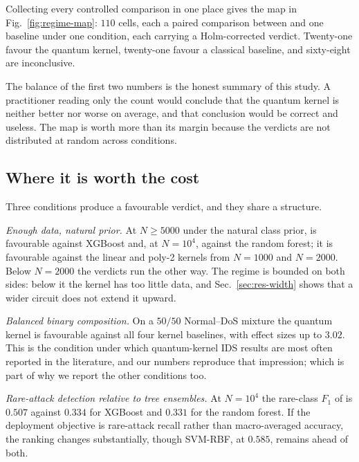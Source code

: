 %





Collecting every controlled comparison in one place gives the map in
Fig.~\ref{fig:regime-map}: $110$ cells, each a paired comparison between
\QSVM{} and one baseline under one condition, each carrying a Holm-corrected
verdict. Twenty-one favour the quantum kernel, twenty-one favour a classical
baseline, and sixty-eight are inconclusive.

The balance of the first two numbers is the honest summary of this study. A
practitioner reading only the count would conclude that the quantum kernel is
neither better nor worse on average, and that conclusion would be correct and
useless. The map is worth more than its margin because the verdicts are not
distributed at random across conditions.

\subsection{Where it is worth the cost}
\begin{revbody}

Three conditions produce a favourable verdict, and they share a structure.

\emph{Enough data, natural prior.} At $N\geq5000$ under the natural class prior,
\QSVM{} is favourable against XGBoost and, at $N=10^{4}$, against the random
forest; it is favourable against the linear and poly-2 kernels from $N=1000$ and
$N=2000$. Below $N=2000$ the verdicts run the other way. The regime is bounded
on both sides: below it the kernel has too little data, and
Sec.~\ref{sec:res-width} shows that a wider circuit does not extend it upward.

\emph{Balanced binary composition.} On a $50/50$ Normal--DoS mixture the quantum
kernel is favourable against all four kernel baselines, with effect sizes up to
$3.02$. This is the condition under which quantum-kernel IDS results are most
often reported in the literature, and our numbers reproduce that impression;
which is part of why we report the other conditions too.

\emph{Rare-attack detection relative to tree ensembles.} At $N=10^{4}$ the
rare-class $F_{1}$ of \QSVM{} is $0.507$ against $0.334$ for XGBoost and $0.331$
for the random forest. If the deployment objective is rare-attack recall rather
than macro-averaged accuracy, the ranking changes substantially, though
SVM-RBF, at $0.585$, remains ahead of both.
\end{revbody}

